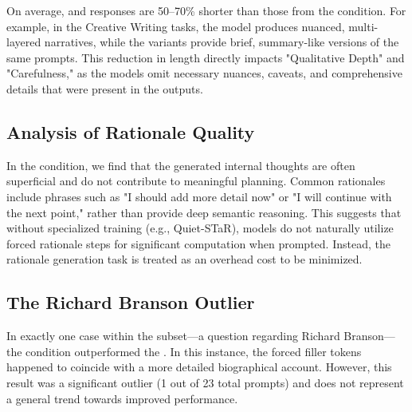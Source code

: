 On average, \bstfiller and \bstrationale responses are 50--70\% shorter than those from the \control condition. For example, in the Creative Writing tasks, the \control model produces nuanced, multi-layered narratives, while the \bst variants provide brief, summary-like versions of the same prompts. This reduction in length directly impacts "Qualitative Depth" and "Carefulness," as the models omit necessary nuances, caveats, and comprehensive details that were present in the \control outputs.

\subsection{Analysis of Rationale Quality}
In the \bstrationale condition, we find that the generated internal thoughts are often superficial and do not contribute to meaningful planning. Common rationales include phrases such as "I should add more detail now" or "I will continue with the next point," rather than provide deep semantic reasoning. This suggests that without specialized training (e.g., Quiet-STaR), models do not naturally utilize forced rationale steps for significant computation when prompted. Instead, the rationale generation task is treated as an overhead cost to be minimized.

\subsection{The Richard Branson Outlier}
In exactly one case within the \tqa subset—a question regarding Richard Branson—the \bstfiller condition outperformed the \control. In this instance, the forced filler tokens happened to coincide with a more detailed biographical account. However, this result was a significant outlier (1 out of 23 total prompts) and does not represent a general trend towards improved performance.